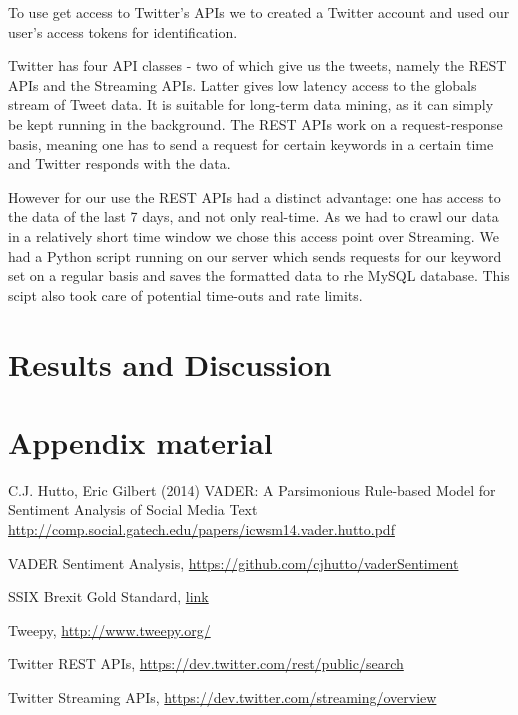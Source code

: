 \documentclass{emulateapj}
\begin{document}
To use get access to Twitter's APIs we to created a Twitter account and used our user's access tokens for identification.

Twitter has four API classes - two of which give us the tweets, namely the REST APIs\cite{rest-apis} and the Streaming APIs\cite{streaming-apis}.
Latter gives low latency access to the globals stream of Tweet data. It is suitable for long-term data mining, as it can simply be kept running in the background.
The REST APIs work on a request-response basis, meaning one has to send a request for certain keywords in a certain time and Twitter responds with the data. 

However for our use the REST APIs had a distinct advantage: one has access to the data of the last 7 days, and not only real-time.
As we had to crawl our data in a relatively short time window we chose this access point over Streaming.
We had a Python script running on our server which sends requests for our keyword set on a regular basis and saves the formatted data to rhe MySQL database.
This scipt also took care of potential time-outs and rate limits.

\section{Results and Discussion}\label{sec:results}


\appendix

\section{Appendix material}


\begin{thebibliography}{9}
   C.J. Hutto, Eric Gilbert (2014) VADER: A Parsimonious Rule-based Model for Sentiment Analysis of Social Media Text
    \url{http://comp.social.gatech.edu/papers/icwsm14.vader.hutto.pdf}

   VADER Sentiment Analysis, \url{https://github.com/cjhutto/vaderSentiment}

   SSIX Brexit Gold Standard, \url{link}

   Tweepy, \url{http://www.tweepy.org/}

   Twitter REST APIs,  \url{https://dev.twitter.com/rest/public/search}

   Twitter Streaming APIs, \url{https://dev.twitter.com/streaming/overview}
\end{thebibliography}
\end{document}
